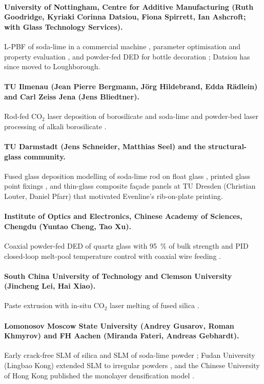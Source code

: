 \paragraph{University of Nottingham, Centre for Additive Manufacturing (Ruth Goodridge, Kyriaki Corinna Datsiou, Fiona Spirrett, Ian Ashcroft; with Glass Technology Services).} L-PBF of soda-lime in a commercial machine \citep{datsiou2019}, parameter optimisation and property evaluation \citep{datsiou2021}, and powder-fed DED for bottle decoration \citep{spirrett2023}; Datsiou has since moved to Loughborough.

\paragraph{TU Ilmenau (Jean Pierre Bergmann, J{\"o}rg Hildebrand, Edda R{\"a}dlein) and Carl Zeiss Jena (Jens Bliedtner).} Rod-fed CO$_2$ laser deposition of borosilicate and soda-lime \citep{froehlich2022} and powder-bed laser processing of alkali borosilicate \citep{boro2025laser}.

\paragraph{TU Darmstadt (Jens Schneider, Matthias Seel) and the structural-glass community.} Fused glass deposition modelling of soda-lime rod on float glass \citep{seel2018}, printed glass point fixings \citep{pointfixings2024}, and thin-glass composite fa\c{c}ade panels at TU Dresden (Christian Louter, Daniel Pfarr) \citep{pfarr2023} that motivated Evenline's rib-on-plate printing.

\paragraph{Institute of Optics and Electronics, Chinese Academy of Sciences, Chengdu (Yuntao Cheng, Tao Xu).} Coaxial powder-fed DED of quartz glass with \SI{95}{\percent} of bulk strength \citep{lang2024} and PID closed-loop melt-pool temperature control with coaxial wire feeding \citep{lgd2025tempctrl}.

\paragraph{South China University of Technology and Clemson University (Jincheng Lei, Hai Xiao).} Paste extrusion with in-situ CO$_2$ laser melting of fused silica \citep{ieee2019dlm,paste2024}.

\paragraph{Lomonosov Moscow State University (Andrey Gusarov, Roman Khmyrov) and FH Aachen (Miranda Fateri, Andreas Gebhardt).} Early crack-free SLM of silica \citep{khmyrov2016,khmyrov2014} and SLM of soda-lime powder \citep{fateri2015}; Fudan University (Lingbao Kong) extended SLM to irregular powders \citep{slmirregular2023}, and the Chinese University of Hong Kong published the monolayer densification model \citep{slmsim2024}.

